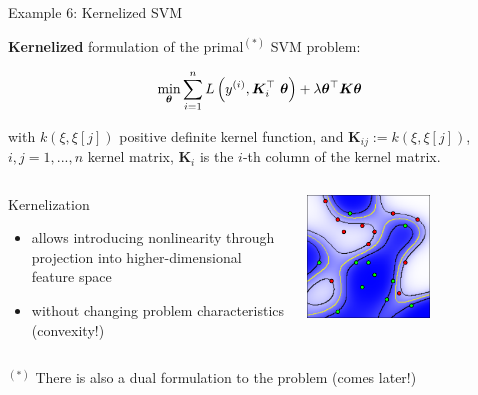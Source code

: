 \documentclass[11pt,compress,t,notes=noshow, xcolor=table]{beamer}
\begin{document}
\begin{vbframe}{Example 6: Kernelized SVM} 

\textbf{Kernelized} formulation of the primal$^{(*)}$ SVM problem: 

\begin{eqnarray*}
	\min_{\bm{\theta}}\sum\limits_{i=1}^n L\left(y^{(i)}, \bm{K}_i^\top ~\bm{\theta}\right) + \lambda \bm{\theta}^\top \bm{K} \bm{\theta} 
\end{eqnarray*}

with $k(\xi, \xi[j])$ positive definite kernel function, and $\bm{K}_{ij} := k(\xi, \xi[j])$, $i, j = 1, ..., n$ kernel matrix, $\bm{K}_i$ is the $i$-th column of the kernel matrix. 

\vspace*{0.2cm}

\begin{columns}[T] %
	\begin{column}{.6\textwidth} 
        Kernelization 
        
        \begin{itemize}
        	\item allows introducing nonlinearity through projection into higher-dimensional feature space
        	\item without changing problem characteristics (convexity!)
        \end{itemize}
	\end{column}
	\begin{column}{.4\textwidth}
		\begin{center}
				\vspace*{-0.5cm}
		    \includegraphics[width=0.6\textwidth]{figure_man/nonlinear-svm-c.pdf}
		\end{center}
	\end{column}

\end{columns}

\vfill
\begin{footnotesize}
$^{(*)}$ There is also a dual formulation to the problem (comes later!)
\end{footnotesize}



\end{vbframe}
\end{document}
